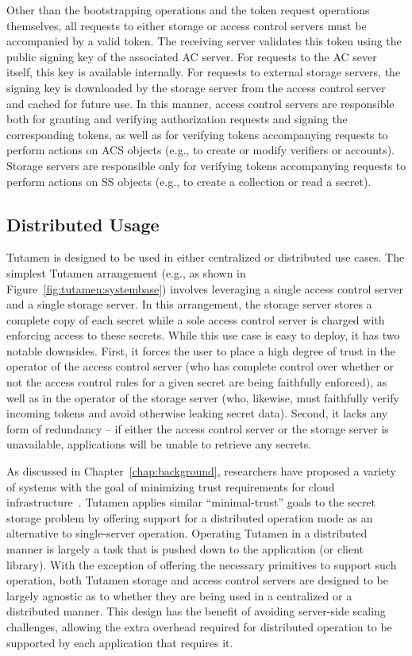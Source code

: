 Other than the bootstrapping operations and the token request
operations themselves, all requests to either storage or access
control servers must be accompanied by a valid token. The receiving
server validates this token using the public signing key of the
associated AC server. For requests to the AC sever itself, this key is
available internally. For requests to external storage servers, the
signing key is downloaded by the storage server from the access
control server and cached for future use. In this manner, access
control servers are responsible both for granting and verifying
authorization requests and signing the corresponding tokens, as well
as for verifying tokens accompanying requests to perform actions on
ACS objects (e.g., to create or modify verifiers or accounts). Storage
servers are responsible only for verifying tokens accompanying
requests to perform actions on SS objects (e.g., to create a
collection or read a secret).

\subsection{Distributed Usage}
\label{chap:tutamen:arch:distributed}

Tutamen is designed to be used in either centralized or distributed
use cases. The simplest Tutamen arrangement (e.g., as shown in
Figure~\ref{fig:tutamen:systembase}) involves leveraging a single
access control server and a single storage server. In this
arrangement, the storage server stores a complete copy of each secret
while a sole access control server is charged with enforcing access to
these secrets. While this use case is easy to deploy, it has two
notable downsides. First, it forces the user to place a high degree of
trust in the operator of the access control server (who has complete
control over whether or not the access control rules for a given
secret are being faithfully enforced), as well as in the operator of
the storage server (who, likewise, must faithfully verify incoming
tokens and avoid otherwise leaking secret data). Second, it lacks any
form of redundancy -- if either the access control server or the
storage server is unavailable, applications will be unable to retrieve
any secrets.

As discussed in Chapter~\ref{chap:background}, researchers have
proposed a variety of systems with the goal of minimizing trust
requirements for cloud infrastructure~\cite{bessani2011,
  kallahalla2003, kubiatowicz2000, mahajan2011,
  wilcox-o'hearn2008}. Tutamen applies similar ``minimal-trust'' goals
to the secret storage problem by offering support for a distributed
operation mode as an alternative to single-server operation. Operating
Tutamen in a distributed manner is largely a task that is pushed down
to the application (or client library). With the exception of offering
the necessary primitives to support such operation, both Tutamen
storage and access control servers are designed to be largely agnostic
as to whether they are being used in a centralized or a distributed
manner. This design has the benefit of avoiding server-side scaling
challenges, allowing the extra overhead required for distributed
operation to be supported by each application that requires it.

